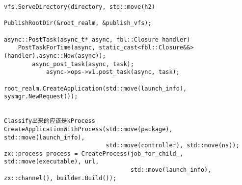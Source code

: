 \begin{verbatim}
vfs.ServeDirectory(directory, std::move(h2)

PublishRootDir(&root_realm, &publish_vfs);

async::PostTask(async_t* async, fbl::Closure handler)
    PostTaskForTime(async, static_cast<fbl::Closure&&>(handler),async::Now(async));
        async_post_task(async, task);
            async->ops->v1.post_task(async, task);

root_realm.CreateApplication(std::move(launch_info), sysmgr.NewRequest());


Classify出来的应该是kProcess
CreateApplicationWithProcess(std::move(package), std::move(launch_info),
                             std::move(controller), std::move(ns));
zx::process process = CreateProcess(job_for_child_, std::move(executable), url,
                                    std::move(launch_info), zx::channel(), builder.Build());

\end{verbatim}